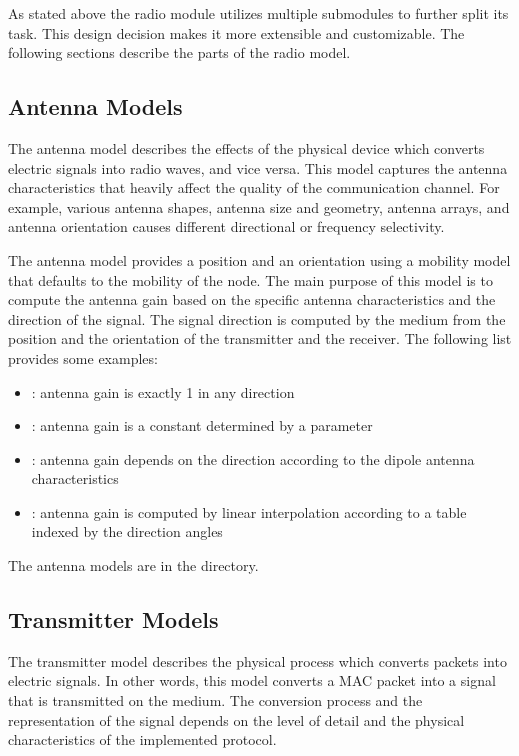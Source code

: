 As stated above the radio module utilizes multiple submodules to further split
its task. This design decision makes it more extensible and customizable. The
following sections describe the parts of the radio model.

\subsection{Antenna Models}

The antenna model describes the effects of the physical device which converts
electric signals into radio waves, and vice versa. This model captures the
antenna characteristics that heavily affect the quality of the communication
channel. For example, various antenna shapes, antenna size and geometry, antenna
arrays, and antenna orientation causes different directional or frequency
selectivity.

The antenna model provides a position and an orientation using a mobility model
that defaults to the mobility of the node. The main purpose of this model is to
compute the antenna gain based on the specific antenna characteristics and the
direction of the signal. The signal direction is computed by the medium from the
position and the orientation of the transmitter and the receiver. The following
list provides some examples:

\begin{itemize}
  \item {}: antenna gain is exactly 1 in any direction
  \item {}: antenna gain is a constant determined by
a parameter
  \item {}: antenna gain depends on the direction according
to the dipole antenna characteristics
  \item {}: antenna gain is computed by linear
interpolation according to a table indexed by the direction angles
\end{itemize}

The antenna models are in the  directory.

\subsection{Transmitter Models}

The transmitter model describes the physical process which converts packets into
electric signals. In other words, this model converts a MAC packet into a signal
that is transmitted on the medium. The conversion process and the representation
of the signal depends on the level of detail and the physical characteristics
of the implemented protocol.

